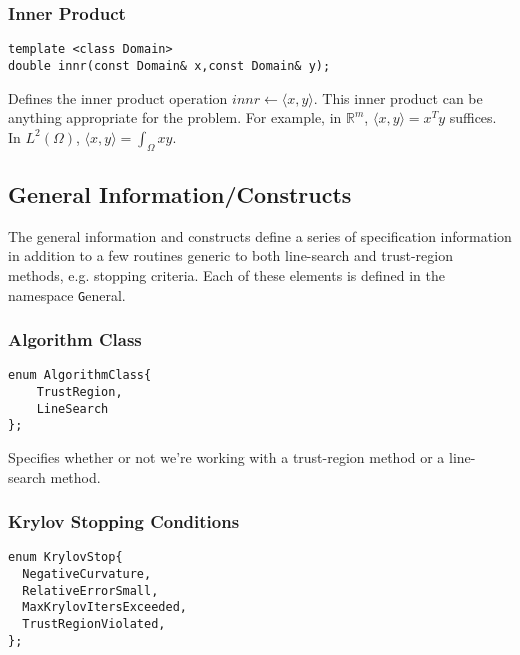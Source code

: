\documentclass{article}
\newcommand{\re}{\mathbb{R}}
\begin{document}
\subsubsection{Inner Product}

\begin{flushleft}
\begin{lstlisting}
template <class Domain>
double innr(const Domain& x,const Domain& y);
\end{lstlisting}
\end{flushleft}

Defines the inner product operation $innr\leftarrow \langle x,y\rangle$.  This inner product can be anything appropriate for the problem.  For example, in $\re^m$, $\langle x,y\rangle=x^Ty$ suffices.  In $L^2(\Omega)$, $\langle x,y\rangle=\int_{\Omega} xy$.

\subsection{General Information/Constructs}

	The general information and constructs define a series of specification information in addition to a few routines generic to both line-search and trust-region methods, e.g. stopping criteria.  Each of these elements is defined in the namespace {\texttt General}. 

\subsubsection{Algorithm Class}

\begin{flushleft}
\begin{lstlisting}
enum AlgorithmClass{
    TrustRegion, 
    LineSearch
};
\end{lstlisting}
\end{flushleft}

Specifies whether or not we're working with a trust-region method or a line-search method.

\subsubsection{Krylov Stopping Conditions}

\begin{flushleft}
\begin{lstlisting}
enum KrylovStop{
  NegativeCurvature,        
  RelativeErrorSmall,      
  MaxKrylovItersExceeded,  
  TrustRegionViolated,    
};
\end{lstlisting}
\end{flushleft}
\end{document}
